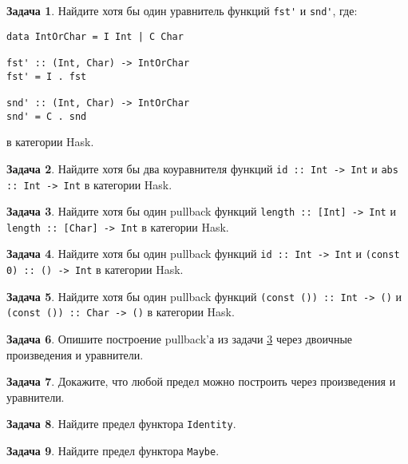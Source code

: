 \documentclass[10pt]{article}
\theoremstyle{definition}
\newtheorem{Pm}{Задача}[subsection]
\begin{document}
\begin{Pm}
    Найдите хотя бы один уравнитель функций \verb|fst'| и \verb|snd'|, где:
    \begin{verbatim}
data IntOrChar = I Int | C Char

fst' :: (Int, Char) -> IntOrChar
fst' = I . fst

snd' :: (Int, Char) -> IntOrChar
snd' = C . snd
    \end{verbatim}

    в категории Hask.
\end{Pm}

\begin{Pm}
    Найдите хотя бы два коуравнителя функций \verb|id :: Int -> Int| и \verb|abs :: Int -> Int| в категории Hask.
\end{Pm}

\begin{Pm}
    Найдите хотя бы один pullback функций \verb|length :: [Int] -> Int| и \verb|length :: [Char] -> Int| в категории Hask.
    \label{pullback1}
\end{Pm}

\begin{Pm}
    Найдите хотя бы один pullback функций \verb|id :: Int -> Int| и \verb|(const 0) :: () -> Int| в категории Hask.
\end{Pm}

\begin{Pm}
    Найдите хотя бы один pullback функций \verb|(const ()) :: Int -> ()| и \verb|(const ()) :: Char -> ()| в категории Hask.
\end{Pm}

\begin{Pm}
    Опишите построение pullback'а из задачи \ref{pullback1} через двоичные произведения и уравнители.
\end{Pm}

\begin{Pm}
    Докажите, что любой предел можно построить через произведения и уравнители.
\end{Pm}

\begin{Pm}
    Найдите предел функтора \verb|Identity|.
\end{Pm}

\begin{Pm}
    Найдите предел функтора \verb|Maybe|.
\end{Pm}
\end{document}
